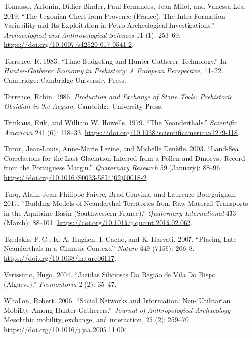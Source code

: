 \documentclass[
  a4paper,
  DIV=11,
  numbers=noendperiod]{scrreprt}
\newlength{\cslhangindent}
\newenvironment{CSLReferences}[2] %
 {\begin{list}{}{%
  \setlength{\itemindent}{0pt}
  \setlength{\leftmargin}{0pt}
  \setlength{\parsep}{0pt}
  \ifodd #1
   \setlength{\leftmargin}{\cslhangindent}
   \setlength{\itemindent}{-1\cslhangindent}
  \fi
  \setlength{\itemsep}{#2\baselineskip}}}
 {\end{list}}
\begin{document}
\begin{CSLReferences}{1}{0}
Tomasso, Antonin, Didier Binder, Paul Fernandes, Jean Milot, and Vanessa
Léa. 2019. {``The {Urgonian} Chert from {Provence} ({France}): The
Intra-Formation Variability and Its Exploitation in Petro-Archeological
Investigations.''} \emph{Archaeological and Anthropological Sciences} 11
(1): 253--69. \url{https://doi.org/10.1007/s12520-017-0541-2}.

Torrence, R. 1983. {``Time Budgeting and Hunter-Gatherer Technology.''}
In \emph{Hunter-{Gatherer Economy} in {Prehistory}: {A European
Perspective}}, 11--22. Cambridge: Cambridge University Press.

Torrence, Robin. 1986. \emph{Production and Exchange of Stone Tools:
Prehistoric Obsidian in the Aegean}. Cambridge University Press.

Trinkaus, Erik, and William W. Howells. 1979. {``The {Neanderthals}.''}
\emph{Scientific American} 241 (6): 118--33.
\url{https://doi.org/10.1038/scientificamerican1279-118}.

Turon, Jean-Louis, Anne-Marie Lezine, and Michelle Denèfle. 2003.
{``Land-Sea Correlations for the Last Glaciation Inferred from a Pollen
and Dinocyst Record from the Portuguese Margin.''} \emph{Quaternary
Research} 59 (January): 88--96.
\url{https://doi.org/10.1016/S0033-5894(02)00018-2}.

Turq, Alain, Jean-Philippe Faivre, Brad Gravina, and Laurence
Bourguignon. 2017. {``Building Models of {Neanderthal} Territories from
Raw Material Transports in the {Aquitaine Basin} (Southwestern
{France}).''} \emph{Quaternary International} 433 (March): 88--101.
\url{https://doi.org/10.1016/j.quaint.2016.02.062}.

Tzedakis, P. C., K. A. Hughen, I. Cacho, and K. Harvati. 2007.
{``Placing Late {Neanderthals} in a Climatic Context.''} \emph{Nature}
449 (7159): 206--8. \url{https://doi.org/10.1038/nature06117}.

Verissimo, Hugo. 2004. {``Jazidas Siliciosas Da Regi{ã}o de {Vila} Do
{Bispo} ({Algarve}).''} \emph{Promontoria} 2 (2): 35--47.

Whallon, Robert. 2006. {``Social Networks and Information:
{Non-}{`Utilitarian'} Mobility Among Hunter-Gatherers.''} \emph{Journal
of Anthropological Archaeology}, Mesolithic mobility, exchange, and
interaction, 25 (2): 259--70.
\url{https://doi.org/10.1016/j.jaa.2005.11.004}.


\end{CSLReferences}
\end{document}
